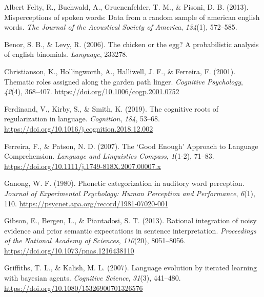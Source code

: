 \documentclass[10pt, letterpaper, hidelinks]{article}
\newenvironment{CSLReferences}%
  {}%
  {\par}
\begin{document}
\hypertarget{refs}{}
\begin{CSLReferences}{1}{0}
\leavevmode{}%
Albert Felty, R., Buchwald, A., Gruenenfelder, T. M., \& Pisoni, D. B.
(2013). Misperceptions of spoken words: Data from a random sample of
american english words. \emph{The Journal of the Acoustical Society of
America}, \emph{134}(1), 572--585.

\leavevmode{}%
Benor, S. B., \& Levy, R. (2006). The chicken or the egg? A
probabilistic analysis of english binomials. \emph{Language}, 233278.

\leavevmode{}%
Christianson, K., Hollingworth, A., Halliwell, J. F., \& Ferreira, F.
(2001). Thematic roles assigned along the garden path linger.
\emph{Cognitive Psychology}, \emph{42}(4), 368--407.
\url{https://doi.org/10.1006/cogp.2001.0752}

\leavevmode{}%
Ferdinand, V., Kirby, S., \& Smith, K. (2019). The cognitive roots of
regularization in language. \emph{Cognition}, \emph{184}, 53--68.
\url{https://doi.org/10.1016/j.cognition.2018.12.002}

\leavevmode{}%
Ferreira, F., \& Patson, N. D. (2007). The {`}Good Enough{'} Approach to
Language Comprehension. \emph{Language and Linguistics Compass},
\emph{1}(1-2), 71--83.
\url{https://doi.org/10.1111/j.1749-818X.2007.00007.x}

\leavevmode{}%
Ganong, W. F. (1980). Phonetic categorization in auditory word
perception. \emph{Journal of Experimental Psychology: Human Perception
and Performance}, \emph{6}(1), 110.
\url{https://psycnet.apa.org/record/1981-07020-001}

\leavevmode{}%
Gibson, E., Bergen, L., \& Piantadosi, S. T. (2013). Rational
integration of noisy evidence and prior semantic expectations in
sentence interpretation. \emph{Proceedings of the National Academy of
Sciences}, \emph{110}(20), 8051--8056.
\url{https://doi.org/10.1073/pnas.1216438110}

\leavevmode{}%
Griffiths, T. L., \& Kalish, M. L. (2007). Language evolution by
iterated learning with bayesian agents. \emph{Cognitive Science},
\emph{31}(3), 441--480. \url{https://doi.org/10.1080/15326900701326576}


\end{CSLReferences}
\end{document}
